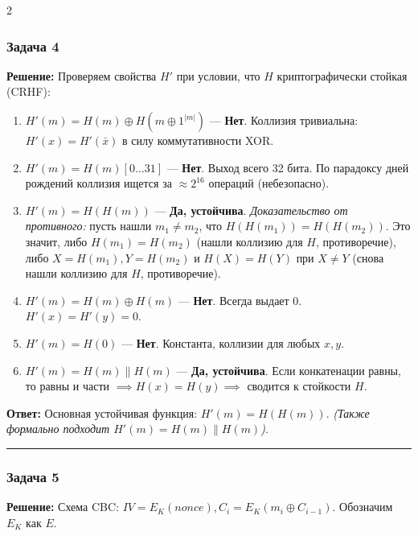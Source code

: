 ﻿\documentclass[10pt,a4paper,landscape]{extarticle}
\newcommand{\tightlist}{}
\begin{document}
\begin{multicols*}{2}
\subsubsection{Задача 4}\label{ux437ux430ux434ux430ux447ux430-4}

\textbf{Решение:} Проверяем свойства \(H'\) при условии, что \(H\) криптографически стойкая (CRHF):

\begin{enumerate}
\def\labelenumi{\arabic{enumi}.}
\tightlist
\item
  \(H'(m) = H(m) \oplus H(m \oplus 1^{|m|})\) --- \textbf{Нет}. Коллизия тривиальна: \(H'(x) = H'(\bar{x})\) в силу коммутативности XOR.
\item
  \(H'(m) = H(m)[0\dots31]\) --- \textbf{Нет}. Выход всего 32 бита. По парадоксу дней рождений коллизия ищется за \(\approx 2^{16}\) операций (небезопасно).
\item
  \(H'(m) = H(H(m))\) --- \textbf{Да, устойчива}. \emph{Доказательство от противного:} пусть нашли \(m_1 \neq m_2\), что \(H(H(m_1)) = H(H(m_2))\). Это значит, либо \(H(m_1) = H(m_2)\) (нашли коллизию для \(H\), противоречие), либо \(X = H(m_1), Y = H(m_2)\) и \(H(X) = H(Y)\) при \(X \neq Y\) (снова нашли коллизию для \(H\), противоречие).
\item
  \(H'(m) = H(m) \oplus H(m)\) --- \textbf{Нет}. Всегда выдает 0. \(H'(x) = H'(y) = 0\).
\item
  \(H'(m) = H(0)\) --- \textbf{Нет}. Константа, коллизии для любых \(x, y\).
\item
  \(H'(m) = H(m) \parallel H(m)\) --- \textbf{Да, устойчива}. Если конкатенации равны, то равны и части \(\implies H(x)=H(y) \implies\) сводится к стойкости \(H\).
\end{enumerate}

\textbf{Ответ:} Основная устойчивая функция: \textbf{\(H'(m) = H(H(m))\)}. \emph{(Также формально подходит \(H'(m) = H(m) \parallel H(m)\))}.

\begin{center}\rule{0.5\linewidth}{0.5pt}\end{center}

\subsubsection{Задача 5}\label{ux437ux430ux434ux430ux447ux430-5}

\textbf{Решение:} Схема CBC: \(IV = E_K(nonce), C_i = E_K(m_i \oplus C_{i-1})\). Обозначим \(E_K\) как \(E\).


\end{multicols*}
\end{document}
